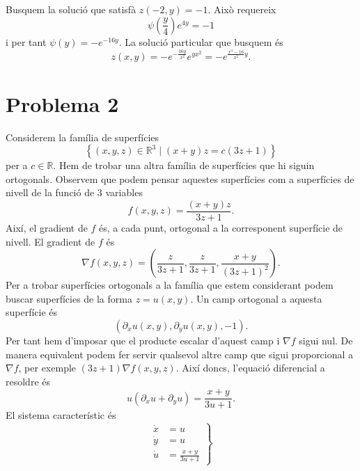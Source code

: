 \documentclass[12pt]{article}
\numberwithin{table}{section}
\numberwithin{equation}{section}
\numberwithin{figure}{section}
\newcommand{\R}{\mathbb{R}}
\newcommand{\set}[2]{\left\{ #1 \mid #2 \right\}}
\begin{document}
Busquem la solució que satisfà \( z(-2,y) = -1 \). Això requereix
\begin{equation*}
	\psi\left(\frac{y}{4}\right) e^{4y} = -1
\end{equation*}
i per tant \( \psi(y) = -e^{-16y} \). La solució particular que busquem és
\begin{equation*}
	z(x,y) = -e^{-\frac{16y}{x^2}} e^{yx^2} = -e^{\frac{x^4 - 16}{x^2}y}.
\end{equation*}



\addtocounter{section}{2}
\addtocounter{section}{-1}
\setcounter{equation}{0}
\section*{Problema 2}
Considerem la família de superfícies
\begin{equation*}
	\set{(x,y,z) \in \R^3}{(x+y)z = c(3z + 1)}
\end{equation*}
per a \( c\in \R \). Hem de trobar una altra família de superfícies que hi siguin ortogonals. Observem que podem pensar aquestes superfícies com a superfícies de nivell de la funció de 3 variables
\begin{equation*}
	f(x,y,z) = \frac{(x+y)z}{3z+1}.
\end{equation*}
Així, el gradient de \( f \) és, a cada punt, ortogonal a la corresponent superfície de nivell. El gradient de \( f \) és
\begin{equation*}
	\nabla f(x,y,z) = \left(\frac{z}{3z+1}, \frac{z}{3z+1}, \frac{x+y}{(3z+1)^2}\right).
\end{equation*}
Per a trobar superfícies ortogonals a la família que estem considerant podem buscar superfícies de la forma \( z = u(x,y) \). Un camp ortogonal a aquesta superfície és 
\begin{equation*}
	\left(\partial_xu(x,y), \partial_y u(x,y), -1\right).
\end{equation*}
Per tant hem d'imposar que el producte escalar d'aquest camp i \( \nabla f \) sigui nul. De manera equivalent podem fer servir qualsevol altre camp que sigui proporcional a \( \nabla f \), per exemple \( (3z+1)\nabla f(x,y,z) \). Així doncs, l'equació diferencial a resoldre és
\begin{equation*}
	u (\partial_x u + \partial_y u) = \frac{x+y}{3u + 1}.
\end{equation*}
El sistema característic és
\begin{equation*}
	\left. 	
		\begin{aligned}
			\dot{x} & = u \\
			\dot{y} & = u \\
			\dot{u} & = \frac{x+y}{3u + 1}
		\end{aligned}
	\right\}
\end{equation*}
\end{document}
